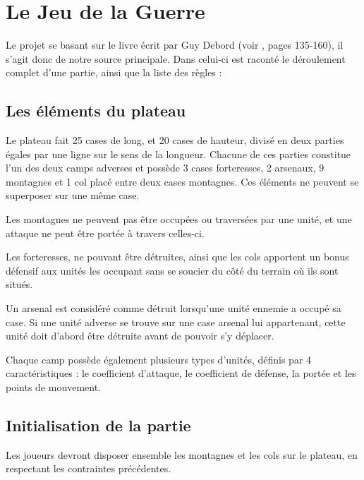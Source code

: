 \documentclass[a4paper]{report}
\begin{document}
\section{Le Jeu de la Guerre}

Le projet se basant sur le livre écrit par Guy Debord (voir \cite{jdg}, pages 135-160), il s'agit donc de notre source principale. Dans celui-ci est raconté le déroulement complet d'une partie, ainsi que la liste des règles :

  
\subsection{Les éléments du plateau}
Le plateau fait 25 cases de long, et 20 cases de hauteur, divisé en deux parties égales par une ligne sur le sens de la longueur. Chacune de ces parties constitue l'un des deux camps adverses et possède 3 cases forteresses, 2 arsenaux, 9 montagnes et 1 col placé entre deux cases montagnes. Ces éléments ne peuvent se superposer sur une même case.
\newline

Les montagnes ne peuvent pas être occupées ou traversées par une unité, et une attaque ne peut être portée à travers celles-ci.

Les forteresses, ne pouvant être détruites, ainsi que les cols apportent un bonus défensif aux unités les occupant sans se soucier du côté du terrain où ils sont situés.

Un arsenal est considéré comme détruit lorsqu'une unité ennemie a occupé sa case. Si une unité adverse se trouve sur une case arsenal lui appartenant, cette unité doit d'abord être détruite avant de pouvoir s'y déplacer.
\newline

Chaque camp possède également plusieurs types d'unités, définis par 4 caractéristiques : le coefficient d'attaque, le coefficient de défense, la portée et les points de mouvement.

\subsection{Initialisation de la partie}

Les joueurs devront disposer ensemble les montagnes et les cols sur le plateau, en respectant les contraintes précédentes.
\end{document}
